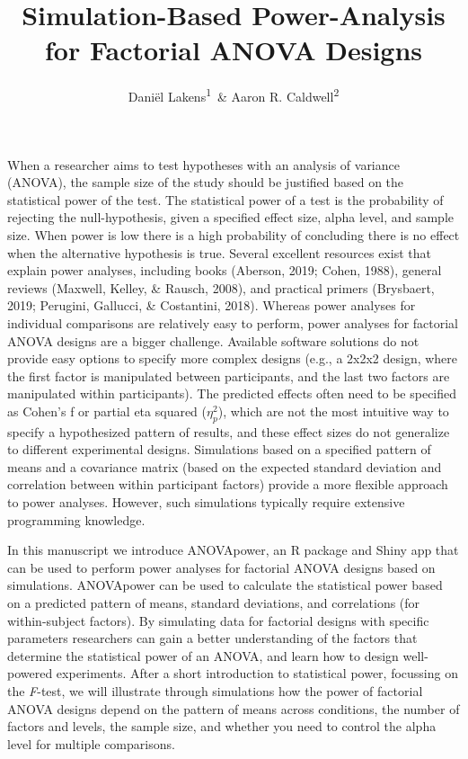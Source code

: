 \documentclass[,jou,floatsintext]{apa6}
\title{Simulation-Based Power-Analysis for Factorial ANOVA Designs}
\author{Daniël Lakens\textsuperscript{1}~\& Aaron R. Caldwell\textsuperscript{2}}
\date{}
\affiliation{
\vspace{0.5cm}
\textsuperscript{1} Human-Technology Interaction Group, Eindhoven University of Technology, The Netherlands\\\textsuperscript{2} Department of Health, Human Performance and Recreation, University of Arkansas, USA}
\begin{document}
\maketitle

When a researcher aims to test hypotheses with an analysis of variance (ANOVA), the sample size of the study should be justified based on the statistical power of the test.
The statistical power of a test is the probability of rejecting the null-hypothesis, given a specified effect size, alpha level, and sample size.
When power is low there is a high probability of concluding there is no effect when the alternative hypothesis is true.
Several excellent resources exist that explain power analyses, including books (Aberson, 2019; Cohen, 1988), general reviews (Maxwell, Kelley, \& Rausch, 2008), and practical primers (Brysbaert, 2019; Perugini, Gallucci, \& Costantini, 2018).
Whereas power analyses for individual comparisons are relatively easy to perform, power analyses for factorial ANOVA designs are a bigger challenge.
Available software solutions do not provide easy options to specify more complex designs (e.g., a 2x2x2 design, where the first factor is manipulated between participants, and the last two factors are manipulated within participants).
The predicted effects often need to be specified as Cohen's f or partial eta squared (\(\eta_p^2\)), which are not the most intuitive way to specify a hypothesized pattern of results, and these effect sizes do not generalize to different experimental designs.
Simulations based on a specified pattern of means and a covariance matrix (based on the expected standard deviation and correlation between within participant factors) provide a more flexible approach to power analyses.
However, such simulations typically require extensive programming knowledge.

In this manuscript we introduce ANOVApower, an R package and Shiny app that can be used to perform power analyses for factorial ANOVA designs based on simulations.
ANOVApower can be used to calculate the statistical power based on a predicted pattern of means, standard deviations, and correlations (for within-subject factors).
By simulating data for factorial designs with specific parameters researchers can gain a better understanding of the factors that determine the statistical power of an ANOVA, and learn how to design well-powered experiments.
After a short introduction to statistical power, focussing on the \emph{F}-test, we will illustrate through simulations how the power of factorial ANOVA designs depend on the pattern of means across conditions, the number of factors and levels, the sample size, and whether you need to control the alpha level for multiple comparisons.
\end{document}
